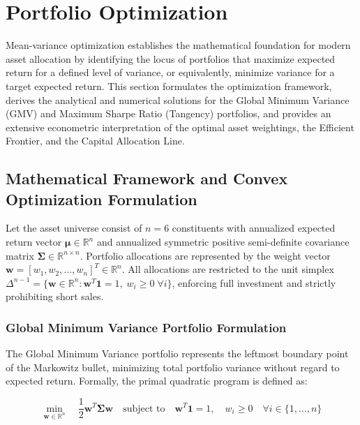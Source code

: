 \section{Portfolio Optimization}

Mean-variance optimization establishes the mathematical foundation for modern asset allocation by identifying the locus of portfolios that maximize expected return for a defined level of variance, or equivalently, minimize variance for a target expected return. This section formulates the optimization framework, derives the analytical and numerical solutions for the Global Minimum Variance (GMV) and Maximum Sharpe Ratio (Tangency) portfolios, and provides an extensive econometric interpretation of the optimal asset weightings, the Efficient Frontier, and the Capital Allocation Line.

\subsection{Mathematical Framework and Convex Optimization Formulation}

Let the asset universe consist of $n = 6$ constituents with annualized expected return vector $\boldsymbol{\mu} \in \mathbb{R}^n$ and annualized symmetric positive semi-definite covariance matrix $\boldsymbol{\Sigma} \in \mathbb{R}^{n \times n}$. Portfolio allocations are represented by the weight vector $\mathbf{w} = [w_1, w_2, \dots, w_n]^T \in \mathbb{R}^n$. All allocations are restricted to the unit simplex $\Delta^{n-1} = \{ \mathbf{w} \in \mathbb{R}^n : \mathbf{w}^T \mathbf{1} = 1, \; w_i \ge 0 \; \forall i \}$, enforcing full investment and strictly prohibiting short sales.

\subsubsection{Global Minimum Variance Portfolio Formulation}

The Global Minimum Variance portfolio represents the leftmost boundary point of the Markowitz bullet, minimizing total portfolio variance without regard to expected return. Formally, the primal quadratic program is defined as:

\begin{equation}
  \min_{\mathbf{w} \in \mathbb{R}^n} \quad \frac{1}{2} \mathbf{w}^T \boldsymbol{\Sigma} \mathbf{w} \quad \text{subject to} \quad \mathbf{w}^T \mathbf{1} = 1, \quad w_i \ge 0 \quad \forall i \in \{1, \dots, n\}
\end{equation}

